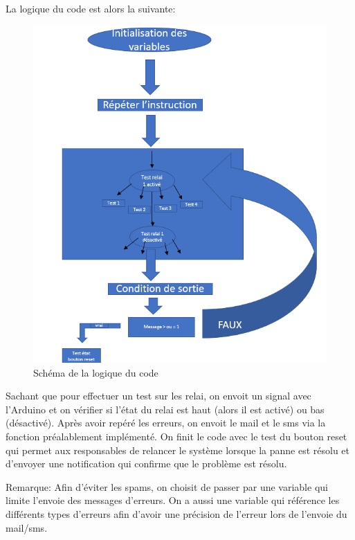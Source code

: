 \documentclass[12pt,a4paper]{article}
\begin{document}
La logique du code est alors la suivante:
\begin{figure}[!h]
\includegraphics[scale=0.55]{structure.PNG}
\caption{Schéma de la logique du code}
\end{figure}
\newpage
Sachant que pour effectuer un test sur les relai, on envoit un signal avec l'Arduino et on vérifier si l'état du relai est haut (alors il est activé) ou bas (désactivé). Après avoir repéré les erreurs, on envoit le mail et le sms via la fonction préalablement implémenté. On finit le code avec le test du bouton reset qui permet aux responsables de relancer le système lorsque la panne est résolu et d'envoyer une notification qui confirme que le problème est résolu. 

\bigskip

Remarque: Afin d'éviter les spams, on choisit de passer par une variable qui limite l'envoie des messages d'erreurs. On a aussi une variable qui référence les différents types d'erreurs afin d'avoir une précision de l'erreur lors de l'envoie du mail/sms.
\end{document}
